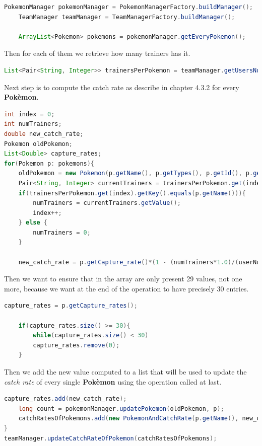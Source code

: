 \begin{lstlisting}[language=Java]
	PokemonManager pokemonManager = PokemonManagerFactory.buildManager();
	TeamManager teamManager = TeamManagerFactory.buildManager();
	
	ArrayList<Pokemon> pokemons = pokemonManager.getEveryPokemon();
\end{lstlisting}

Then for each of them we retrieve how many trainers has it.

\begin{lstlisting}[language=Java]
	List<Pair<String, Integer>> trainersPerPokemon = teamManager.getUsersNumberThatOwnsAPokemonNotFiltered();
\end{lstlisting}
Next step is to compute the catch rate as describe in chapter 4.3.2 for every \textbf{Pokèmon}.

\begin{lstlisting}[language=Java]
int index = 0;
int numTrainers;
double new_catch_rate;
Pokemon oldPokemon;
List<Double> capture_rates;
for(Pokemon p: pokemons){
	oldPokemon = new Pokemon(p.getName(), p.getTypes(), p.getId(), p.getCapture_rate(), p.getCapture_rates(), (int)p.getHeight(), (int)p.getWeight(), p.getBiology(), p.getPortrait(), p.getSprite());
	Pair<String, Integer> currentTrainers = trainersPerPokemon.get(index);
	if(trainersPerPokemon.get(index).getKey().equals(p.getName())){
		numTrainers = currentTrainers.getValue();
		index++;
	} else {
		numTrainers = 0;
	}
	
	new_catch_rate = p.getCapture_rate()*(1 - (numTrainers*1.0)/(userNumber));

\end{lstlisting}

Then we want to ensure that in the array are only present 29 values, not one more, because we want at the end of the operation to have precisely 30 entries.

\begin{lstlisting}[language=Java]
	capture_rates = p.getCapture_rates();
	
	if(capture_rates.size() >= 30){
		while(capture_rates.size() < 30)
		capture_rates.remove(0);
	}
\end{lstlisting}
Then we add the new value computed to a list that will be used to update the \textit{catch rate} of every single \textbf{Pokèmon} using the operation called at last.
\begin{lstlisting}[language=Java]
	capture_rates.add(new_catch_rate);
	long count = pokemonManager.updatePokemon(oldPokemon, p);
	catchRatesOfPokemons.add(new PokemonAndCatchRate(p.getName(), new_catch_rate));
}
teamManager.updateCatchRateOfPokemon(catchRatesOfPokemons);
\end{lstlisting}



